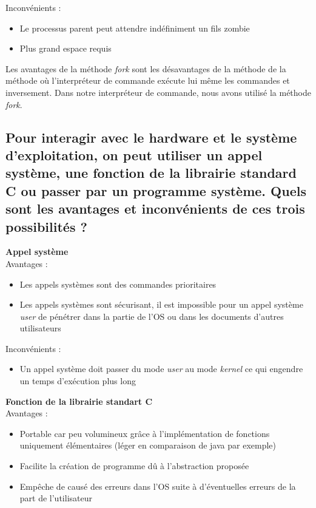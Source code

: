 \documentclass[10pt,a4paper]{article}
\begin{document}
Inconvénients :
\begin{itemize}
\item Le processus parent peut attendre indéfiniment un fils zombie

\item Plus grand espace requis
\end{itemize}

Les avantages de la méthode \textit{fork} sont les désavantages de la méthode de la méthode où l'interpréteur de commande exécute lui même les commandes et inversement. Dans notre interpréteur de commande, nous avons utilisé la méthode \textit{fork}. 

\subsection*{Pour interagir avec le hardware et le système d'exploitation, on peut utiliser un appel système, une  fonction  de  la  librairie  standard  C  ou  passer  par  un  programme  système.  Quels  sont  les avantages et inconvénients de ces trois possibilités ?}

\textbf{Appel système\\}
Avantages :
\begin{itemize}
\item Les appels systèmes sont des commandes prioritaires 
\item Les appels systèmes sont sécurisant, il est impossible pour un appel système \textit{user} de pénétrer dans la partie de l'OS ou dans les documents d'autres utilisateurs 
\end{itemize}

Inconvénients : 
\begin{itemize}
\item Un appel système doit passer du mode \textit{user} au mode \textit{kernel} ce qui engendre un temps d'exécution plus long 
\end{itemize}

\textbf{Fonction de la librairie standart C\\}
Avantages :
\begin{itemize}
\item Portable car peu volumineux grâce à l'implémentation de fonctions uniquement élémentaires (léger en comparaison de java par exemple)

\item Facilite la création de programme dû à l'abstraction proposée
\item Empêche de causé des erreurs dans l'OS suite à d'éventuelles erreurs de la part de l'utilisateur
\end{itemize}
\end{document}
